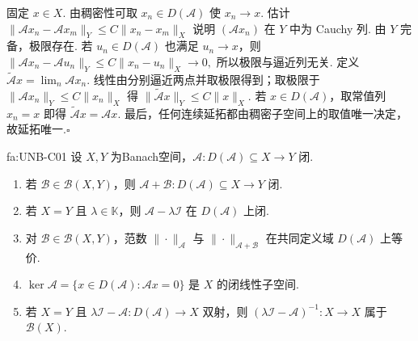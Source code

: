\begin{FAProof}
固定 \(\displaystyle x\in X\). 由稠密性可取 \(\displaystyle x_n\in D(\mathcal A)\) 使 \(\displaystyle x_n\to x\). 估计
\(\displaystyle \|\mathcal Ax_n-\mathcal Ax_m\|_Y \leqslant C\|x_n-x_m\|_X\)
说明 \(\displaystyle(\mathcal Ax_n)\) 在 \(\displaystyle Y\) 中为 Cauchy 列. 由 \(\displaystyle Y\) 完备，极限存在. 若 \(\displaystyle u_n\in D(\mathcal A)\) 也满足 \(\displaystyle u_n\to x\)，则
\(\displaystyle \|\mathcal Ax_n-\mathcal Au_n\|_Y \leqslant C\|x_n-u_n\|_X \longrightarrow0,\)
所以极限与逼近列无关. 定义 \(\displaystyle\widetilde{\mathcal A}x=\lim_n\mathcal Ax_n\). 线性由分别逼近两点并取极限得到；取极限于 \(\displaystyle\|\mathcal Ax_n\|_Y\leqslant C\|x_n\|_X\) 得 \(\displaystyle\|\widetilde{\mathcal A}x\|_Y\leqslant C\|x\|_X\). 若 \(\displaystyle x\in D(\mathcal A)\)，取常值列 \(\displaystyle x_n=x\) 即得 \(\displaystyle\widetilde{\mathcal A}x=\mathcal Ax\). 最后，任何连续延拓都由稠密子空间上的取值唯一决定，故延拓唯一.\hfill\(\square\)
\end{FAProof}

\begin{FAProposition}[C][闭算子计算工具]{fa:UNB-C01}
设 \(\displaystyle X,Y\) 为Banach空间，\(\displaystyle\mathcal A:D(\mathcal A)\subseteq X\to Y\) 闭.
\begin{enumerate}[label=\textnormal{(\roman*)}]
\item 若 \(\displaystyle\mathcal B\in\mathcal B(X,Y)\)，则
\(\displaystyle \mathcal A+\mathcal B:D(\mathcal A)\subseteq X\to Y\)
闭.
\item 若 \(\displaystyle X=Y\) 且 \(\displaystyle\lambda\in\mathbb K\)，则 \(\displaystyle\mathcal A-\lambda\mathcal I\) 在 \(\displaystyle D(\mathcal A)\) 上闭.
\item 对 \(\displaystyle\mathcal B\in\mathcal B(X,Y)\)，范数 \(\displaystyle\|\cdot\|_{\mathcal A}\) 与 \(\displaystyle\|\cdot\|_{\mathcal A+\mathcal B}\) 在共同定义域 \(\displaystyle D(\mathcal A)\) 上等价.
\item \(\displaystyle\ker\mathcal A=\{x\in D(\mathcal A):\mathcal Ax=0\}\) 是 \(\displaystyle X\) 的闭线性子空间.
\item 若 \(\displaystyle X=Y\) 且 \(\displaystyle\lambda\mathcal I-\mathcal A:D(\mathcal A)\to X\) 双射，则
\(\displaystyle (\lambda\mathcal I-\mathcal A)^{-1}:X\to X\)
属于 \(\displaystyle\mathcal B(X)\).
\end{enumerate}
\end{FAProposition}

